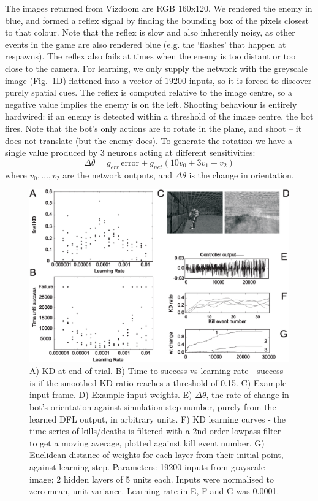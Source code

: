 \documentclass{article}
\begin{document}
The images returned from Vizdoom are RGB 160x120. We rendered the
enemy in blue, and formed a reflex signal by finding the bounding box
of the pixels closest to that colour. Note that the reflex is slow and
also inherently noisy, as other events in the game are also rendered
blue (e.g. the ‘flashes’ that happen at respawns). The reflex also
fails at times when the enemy is too distant or too close to the
camera. For learning, we only supply the network with the greyscale
image (Fig.~\ref{shooter_results}D) flattened into a vector of $19200$
inputs, so it is forced to discover purely spatial cues. The reflex is
computed relative to the image centre, so a negative value implies the
enemy is on the left. Shooting behaviour is entirely hardwired: if an
enemy is detected within a threshold of the image centre, the bot
fires. Note that the bot's only actions are to rotate in the plane,
and shoot -- it does not translate (but the enemy does). To generate
the rotation we have a single value produced by 3 neurons acting at
different sensitivities:
\begin{equation}
\Delta \theta = g_{err}\, \mathrm{error} + g_{net} \left( 10 v_0 + 3 v_1 + v_2 \right)
\end{equation}
where $v_0, \ldots, v_2$ are the network outputs, and $\Delta \theta$
is the change in orientation.


\begin{figure}[!ht]
	\centering \includegraphics[width=\textwidth]{FPSFig7}
	\caption{A) KD at end of trial. B) Time to success vs learning
          rate - success is if the smoothed KD ratio reaches a
          threshold of 0.15. C) Example input frame. D) Example input weights.
          E) $\Delta \theta$, the rate of change in
          bot's orientation against simulation step number, purely
          from the learned DFL output, in arbitrary units. F) KD learning
          curves - the time series of kills/deaths is filtered with a
          2nd order lowpass filter to get a moving average, plotted
          against kill event number. G) Euclidean distance of weights
          for each layer from their initial point, against learning
          step.
          Parameters: 19200 inputs from grayscale image; 2
          hidden layers of 5 units each. Inputs were
          normalised to zero-mean, unit variance. Learning rate in E, F
          and G was 0.0001.
		\label{shooter_results}}
\end{figure}
\end{document}
